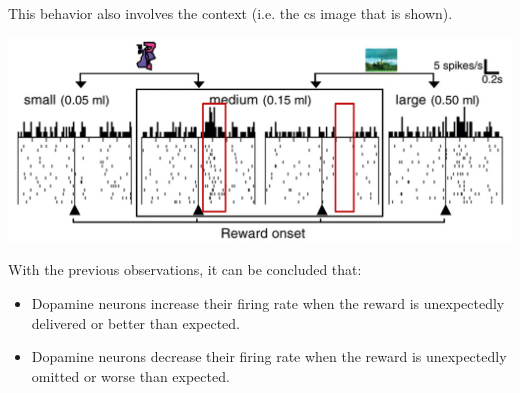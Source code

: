 \begin{description}
\begin{@empty}
\begin{example}
                This behavior also involves the context (i.e. the \ac{cs} image that is shown).
                \begin{center}
                    \includegraphics[width=0.6\linewidth]{./img/dopamine_expected3.png}
                \end{center}
            \end{example}
        \end{@empty}
\end{description}

\begin{remark}
    With the previous observations, it can be concluded that:
    \begin{itemize}
        \item Dopamine neurons increase their firing rate when the reward is unexpectedly delivered or better than expected.
        \item Dopamine neurons decrease their firing rate when the reward is unexpectedly omitted or worse than expected.
    \end{itemize}
\end{remark}

